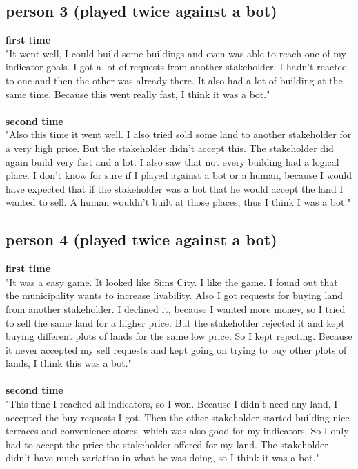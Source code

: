 \subsection{person 3 (played twice against a bot)}
\textbf{first time}\\
"It went well, I could build some buildings and even was able to reach one of my indicator goals. I got a lot of requests from another stakeholder. I hadn't reacted to one and then the other was already there. It also had a lot of building at the same time. Because this went really fast, I think it was a bot."
\\ \\
\textbf{second time}\\
"Also this time it went well. I also tried sold some land to another stakeholder for a very high price. But the stakeholder didn't accept this. The stakeholder did again build very fast and a lot. I also saw that not every building had a logical place. I don't know for sure if I played against a bot or a human, because I would have expected that if the stakeholder was a bot that he would accept the land I wanted to sell. A human wouldn't built at those places, thus I think I was a bot." 

\subsection{person 4 (played twice against a bot)}
 \textbf{first time}\\
 "It was a easy game. It looked like Sims City. I like the game. I found out that the municipality wants to increase livability. Also I got requests for buying land from another stakeholder. I declined it, because I wanted more money, so I tried to sell the same land for a higher price. But the stakeholder rejected it and kept buying different plots of lands for the same low price. So I kept rejecting. Because it never accepted my sell requests and kept going on trying to buy other plots of lands, I think this was a bot." 
 \\ \\
 \textbf{second time}\\
 "This time I reached all indicators, so I won. Because I didn't need any land, I accepted the buy requests I got. Then the other stakeholder started building nice terraces and convenience stores, which was also good for my indicators. So I only had to accept the price the stakeholder offered for my land. The stakeholder didn't have much variation in what he was doing, so I think it was a bot."

